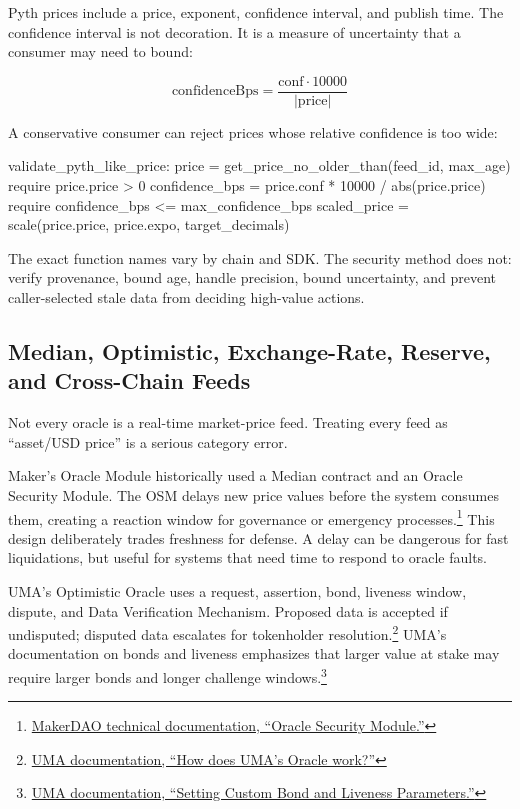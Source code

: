 Pyth prices include a price, exponent, confidence interval, and publish time. The confidence interval is not decoration. It is a measure of uncertainty that a consumer may need to bound:

\[
    \mathrm{confidenceBps}
    =
    \frac{\mathrm{conf} \cdot 10000}{|\mathrm{price}|}
\]

A conservative consumer can reject prices whose relative confidence is too wide:

\begin{codeblock}
validate_pyth_like_price:
    price = get_price_no_older_than(feed_id, max_age)
    require price.price > 0
    confidence_bps = price.conf * 10000 / abs(price.price)
    require confidence_bps <= max_confidence_bps
    scaled_price = scale(price.price, price.expo, target_decimals)
\end{codeblock}

The exact function names vary by chain and SDK. The security method does not: verify provenance, bound age, handle precision, bound uncertainty, and prevent caller-selected stale data from deciding high-value actions.

\subsection{Median, Optimistic, Exchange-Rate, Reserve, and Cross-Chain Feeds}

Not every oracle is a real-time market-price feed. Treating every feed as ``asset/USD price'' is a serious category error.

Maker's Oracle Module historically used a Median contract and an Oracle Security Module. The OSM delays new price values before the system consumes them, creating a reaction window for governance or emergency processes.\footnote{\href{https://docs.makerdao.com/smart-contract-modules/oracle-module/oracle-security-module-osm-detailed-documentation}{MakerDAO technical documentation, ``Oracle Security Module.''}} This design deliberately trades freshness for defense. A delay can be dangerous for fast liquidations, but useful for systems that need time to respond to oracle faults.

UMA's Optimistic Oracle uses a request, assertion, bond, liveness window, dispute, and Data Verification Mechanism. Proposed data is accepted if undisputed; disputed data escalates for tokenholder resolution.\footnote{\href{https://docs.uma.xyz/protocol-overview/how-does-umas-oracle-work}{UMA documentation, ``How does UMA's Oracle work?''}} UMA's documentation on bonds and liveness emphasizes that larger value at stake may require larger bonds and longer challenge windows.\footnote{\href{https://docs.uma.xyz/developers/setting-custom-bond-and-liveness-parameters}{UMA documentation, ``Setting Custom Bond and Liveness Parameters.''}}

